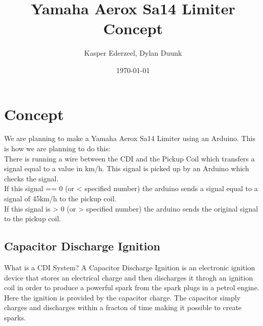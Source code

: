 \documentclass[a4paper]{article}
\begin{document}
\title{Yamaha Aerox Sa14 Limiter Concept}
\author{Kasper Ederzeel, Dylan Duunk}
\date{\today}
\maketitle

\newpage
\tableofcontents
\newpage
{}

\section{Concept}
We are planning to make a Yamaha Aerox Sa14 Limiter using an Arduino. 
This is how we are planning to do this: \\
There is running a wire between the CDI and the Pickup Coil which transfers a signal equal to a value in km/h. 
This signal is picked up by an Arduino which checks the signal. \\
If this signal == 0 (or < specified number) the arduino sends a signal equal to a signal of 45km/h to the pickup coil. \\
If this signal is > 0 (or > specified number) the arduino sends the original signal to the pickup coil.

\subsection{Capacitor Discharge Ignition}
What is a CDI System? 
A Capacitor Discharge Ignition is an electronic ignition device that stores an electrical 
charge and then discharges it throgh an ignition coil
in order to produce a powerful spark from the spark plugs in a petrol engine.
Here the ignition is provided by the capacitor charge.
The capacitor simply charges and discharges within a fracton of time
making it possible to create sparks. 
\end{document}
